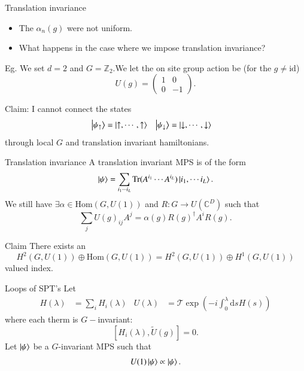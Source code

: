 \documentclass{beamer}
\newcommand{\CC}{\mathbb{C}}
\newcommand{\dd}{\mathrm{d}}
\newcommand{\ZZ}{\mathbb{Z}}
\begin{document}
\begin{frame}{Translation invariance}
\begin{itemize}
\item The $\alpha_n(g)$ were not uniform.
\pause
\item What happens in the case where we impose translation invariance?
\end{itemize}
Eg. We set $d=2$ and $G=\ZZ_2$.\pause We let the on site group action be (for the $g\neq \text{id}$)
\[U(g)=\begin{pmatrix}1&0\\0&-1\end{pmatrix}.\]
\pause
\begin{block}{Claim:}
I cannot connect the states
\begin{align*}
\ket{\psi_\uparrow}&=\ket{\uparrow,\cdots,\uparrow}&\ket{\psi_\downarrow}&=\ket{\downarrow,\cdots,\downarrow}
\end{align*}
through local $G$ and translation invariant hamiltonians.
\end{block}
\end{frame}

\begin{frame}{Translation invariance}
A translation invariant MPS is of the form
\[\ket{\psi}=\sum_{i_1\cdots i_L}\textrm{Tr}(A^{i_1}\cdots A^{i_L})\ket{i_1,\cdots i_L}.\]
\pause
We still have $\exists \alpha\in\text{Hom}(G,U(1))$ and $R:G\rightarrow U(\CC^D)$ such that
 \[\sum_j U(g)_{ij}A^j=\alpha(g) R(g)^\dagger A^i R(g).\]
\pause
\begin{block}{Claim}
There exists an
\[H^2(G,U(1))\oplus \text{Hom}(G,U(1))=H^2(G,U(1))\oplus H^1(G,U(1))\]
valued index.
\end{block}
\end{frame}

\begin{frame}{Loops of SPT's}
Let
\begin{align}
H(\lambda)&= \sum_i H_i(\lambda)&U(\lambda)&= \mathcal{T}\exp(-i\int_0^\lambda \dd s H(s))
\end{align}
where each therm is $G-$invariant:
\[[H_i(\lambda),\tilde{U}(g)]=0.\]
\pause
Let $\ket{\psi}$ be a $G$-invariant MPS such that
\[U(1)\ket{\psi}\propto \ket{\psi}.\]
\end{frame}
\end{document}
